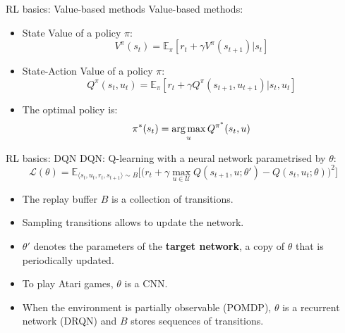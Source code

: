 \documentclass[9pt, hyperref={pdfusetitle,colorlinks=true,allcolors=DarkBlue}]{beamer}
\begin{document}
\begin{frame}{RL basics: Value-based methods}
Value-based methods:
\vfill
    \begin{itemize}
    \item State Value of a policy $\pi$:
    \begin{equation*}
    V^\pi(s_t) = \mathbb{E}_\pi \left[r_t + \gamma V^\pi(s_{t+1}) | s_t\right]
    \end{equation*}
    \vfill
    \item State-Action Value of a policy $\pi$:
    \begin{equation*}
    Q^\pi(s_t, u_t)  = \mathbb{E}_\pi \left[r_t + \gamma  Q^\pi(s_{t+1}, u_{t+1}) | s_t, u_t \right]
    \end{equation*}
    \vfill
    \item The optimal policy is:
    \begin{equation*}
    \pi^*(s_t) = \operatorname*{arg\,max}_u Q^{\pi^*}(s_{t}, u)
    \end{equation*}
\end{itemize}{}
\end{frame}

\begin{frame}{RL basics: DQN}
DQN: Q-learning with a neural network parametrised by $\theta$:
\begin{equation*}
    \mathcal{L}(\theta) = \mathds{E}_{\langle s_{t},u_{t},r_{t},s_{t+1}\rangle \sim B} 
    \bigg[  
    \big(r_{t} + \gamma \max_{u \in \mathcal{U}} Q(s_{t+1}, u; \theta')
    - Q(s_{t}, u_{t}; \theta)\big)^{2}\bigg]
    \label{eq:DQN_loss}
\end{equation*}
\vfill
\begin{itemize}
    
    \item The replay buffer $B$ is a collection of transitions.
    \item Sampling transitions allows to update the network.
    \item $\theta'$ denotes the parameters of the \textbf{target network}, a copy of $\theta$ that is periodically updated.
    \vfill
    \item To play Atari games, $\theta$ is a CNN.
    \item When the environment is partially observable (POMDP), $\theta$ is a recurrent network (DRQN) and $B$ stores sequences of transitions.
    
    
\end{itemize}{}
\end{frame}
\end{document}
